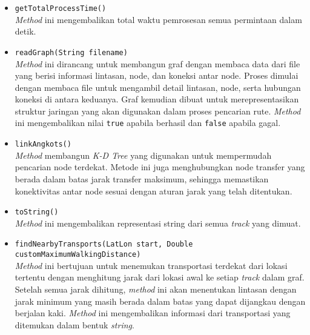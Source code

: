 \begin{itemize}
\begin{itemize}
        \item \texttt{getTotalProcessTime()}
        \\ \textit{Method} ini mengembalikan total waktu pemrosesan semua permintaan dalam detik.
        \item \texttt{readGraph(String filename)}
        \\ \textit{Method} ini dirancang untuk membangun graf dengan membaca data dari file yang berisi informasi lintasan, node, dan koneksi antar node. Proses dimulai dengan membaca file untuk mengambil detail lintasan, node, serta hubungan koneksi di antara keduanya. Graf kemudian dibuat untuk merepresentasikan struktur jaringan yang akan digunakan dalam proses pencarian rute. \textit{Method} ini mengembalikan nilai \texttt{true} apabila berhasil dan \texttt{false} apabila gagal.

        \item \texttt{linkAngkots()}
        \\ \textit{Method} membangun \textit{K-D Tree} yang digunakan untuk mempermudah pencarian node terdekat. Metode ini juga menghubungkan node transfer yang berada dalam batas jarak transfer maksimum, sehingga memastikan konektivitas antar node sesuai dengan aturan jarak yang telah ditentukan.
        \item \texttt{toString()}
        \\ \textit{Method} ini mengembalikan representasi string dari semua \textit{track} yang dimuat.
        \item \texttt{findNearbyTransports(LatLon start, Double customMaximumWalkingDistance)}
        \\ \textit{Method} ini bertujuan untuk menemukan transportasi terdekat dari lokasi tertentu dengan menghitung jarak dari lokasi awal ke setiap \textit{track} dalam graf. Setelah semua jarak dihitung, \textit{method} ini akan menentukan lintasan dengan jarak minimum yang masih berada dalam batas yang dapat dijangkau dengan berjalan kaki. \textit{Method} ini mengembalikan informasi dari transportasi yang ditemukan dalam bentuk \textit{string}.
    \end{itemize}
\end{itemize}
\newpage
